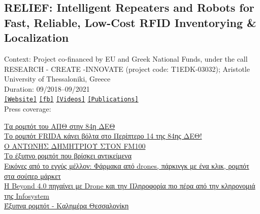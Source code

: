 \subsection{RELIEF: Intelligent Repeaters and Robots for Fast, Reliable, Low-Cost RFID Inventorying \& Localization}

Context: Project co-financed by EU and Greek National Funds, under the call RESEARCH - CREATE -INNOVATE (project code: T1EDK-03032); Aristotle University of Thessaloniki, Greece\\

\noindent Duration: 09/2018--09/2021\\

\noindent \href{http://relief.web.auth.gr/language/en/home/}{\texttt{[Website]}} \href{https://www.facebook.com/ReliefAuth}{\texttt{[fb]}} \href{https://www.youtube.com/@antonidimi/search?query=relief}{\texttt{[Videos]}} \href{https://relief.web.auth.gr/language/en/publications/}{\texttt{[Publications]}} \\

\noindent Press coverage:

\noindent \href{https://www.amna.gr/home/videos/391130/Ta-rompot-tou-APTh-stin-84i-DETh}{Τα ρομπότ του ΑΠΘ στην 84η ΔΕΘ}\\
\noindent \href{https://www.typosthes.gr/thessaloniki/195192_rompot-frida-kanei-bolta-sto-periptero-14-tis-84is-deth-video}{Το ρομπότ FRIDA κάνει βόλτα στο Περίπτερο 14 της 84ης ΔΕΘ!}\\
\noindent \href{https://fm100.gr/media/single/o-antonis-dimitrioy-ston-fm100-o-fm100-stin-84i-deth}{Ο ΑΝΤΩΝΗΣ ΔΗΜΗΤΡΙΟΥ ΣΤΟΝ FM100}\\
\noindent \href{https://www.thessnews.gr/reportaz/to-exypno-robot-pou-vriskei-antikeimena-foto-video/}{Το έξυπνο ρομπότ που βρίσκει αντικείμενα}\\
\noindent \href{https://www.kathimerini.gr/society/561544489/vinteo-k-eikones-apo-to-eggys-mellon-farmaka-apo-drones-parkingk-me-ena-klik-rompot-sta-soyper-market/}{Εικόνες από το εγγύς μέλλον: Φάρμακα από drones, πάρκινγκ με ένα κλικ, ρομπότ στα σούπερ μάρκετ}\\
\noindent \href{https://www.amna.gr/macedonia/article/593568/I-Beyond-40-pigainei-me-Drone-kai-tin-Pliroforia-pio-pera-apo-tin-klironomia-tis-Infosystem}{Η Beyond 4.0 πηγαίνει με Drone και την Πληροφορία πιο πέρα από την κληρονομιά της Infosystem}\\
\noindent \href{https://www.facebook.com/watch/?v=525073015980746}{Έξυπνα ρομπότ - Καλημέρα Θεσσαλονίκη}\\



